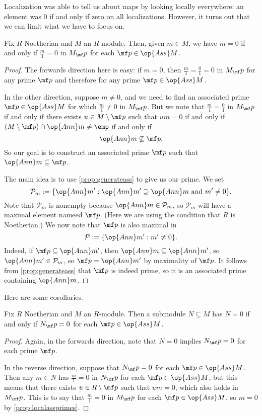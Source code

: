 Localization was able to tell us about maps by looking locally everywhere: an element was $0$ if and only if zero on all localizations. However, it turns out that we can limit what we have to focus on.
\begin{proposition} \label{prop:localassprimes}
	Fix $R$ Noetherian and $M$ an $R$-module. Then, given $m\in M$, we have $m=0$ if and only if $\frac m1=0$ in $M_\mf p$ for each $\mf p\in\op{Ass}M$.
\end{proposition}	
\begin{proof}
	The forwards direction here is easy: if $m=0$, then $\frac m1=\frac01=0$ in $M_\mf p$ for any prime $\mf p$ and therefore for any prime $\mf p\in\op{Ass}M$.

	In the other direction, suppose $m\ne0$, and we need to find an associated prime $\mf p\in\op{Ass}M$ for which $\frac m1\ne0$ in $M_\mf p$. But we note that $\frac m1=\frac01$ in $M_\mf p$ if and only if there exists $u\in M\setminus\mf p$ such that $um=0$ if and only if $(M\setminus\mf p)\cap\op{Ann}m\ne\emp$ if and only if
	\[\op{Ann}m\not\subseteq\mf p.\]
	So our goal is to construct an associated prime $\mf p$ such that $\op{Ann}m\subseteq\mf p$.
	
	The main idea is to use \autoref{prop:generateass} to give us our prime. We set
	\[\mathcal P_m:=\{\op{Ann}m':\op{Ann}m'\supseteq\op{Ann}m\text{ and }m'\ne0\}.\]
	Note that $\mathcal P_m$ is nonempty because $\op{Ann}m\in\mathcal P_m$, so $\mathcal P_m$ will have a maximal element nameed $\mf p$. (Here we are using the condition that $R$ is Noetherian.) We now note that $\mf p$ is also maximal in
	\[\mathcal P:=\{\op{Ann}m':m'\ne0\}.\]
	Indeed, if $\mf p\subseteq\op{Ann}m'$, then $\op{Ann}m\subseteq\op{Ann}m'$, so $\op{Ann}m'\in\mathcal P_m$, so $\mf p=\op{Ann}m'$ by maximality of $\mf p$. It follows from \autoref{prop:generateass} that $\mf p$ is indeed prime, so it is an associated prime containing $\op{Ann}m$.
\end{proof}
Here are some corollaries.
\begin{corollary} \label{cor:localasssubmod}
	Fix $R$ Noetherian and $M$ an $R$-module. Then a submodule $N\subseteq M$ has $N=0$ if and only if $N_\mf p=0$ for each $\mf p\in\op{Ass}M$.
\end{corollary}
\begin{proof}
	Again, in the forwards direction, note that $N=0$ implies $N_\mf p=0$ for each prime $\mf p$.

	In the reverse direction, suppose that $N_\mf p=0$ for each $\mf p\in\op{Ass}M$. Then any $m\in N$ has $\frac m1=0$ in $N_\mf p$ for each $\mf p\in\op{Ass}M$, but this means that there exists $u\in R\setminus\mf p$ such that $um=0$, which also holds in $M_\mf p$. This is to say that $\frac m1=0$ in $M_\mf p$ for each $\mf p\in\op{Ass}M$, so $m=0$ by \autoref{prop:localassprimes}.
\end{proof}
